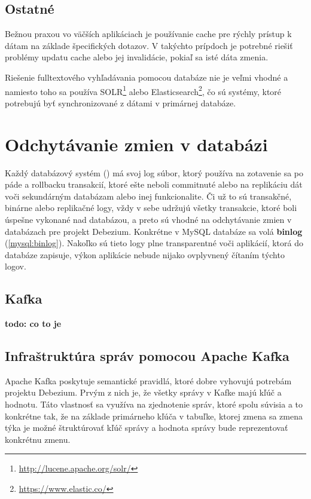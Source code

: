 \subsection{Ostatné}
Bežnou praxou vo väčších aplikáciach je používanie cache pre rýchly prístup k dátam na základe špecifických dotazov. V takýchto prípdoch je potrebné riešiť problémy updatu cache alebo jej invalidácie, pokiaľ sa isté dáta zmenia.

Riešenie fulltextového vyhľadávania pomocou databáze nie je veľmi vhodné a namiesto toho sa používa SOLR\footnote{\url{http://lucene.apache.org/solr/}} alebo Elasticsearch\footnote{\url{https://www.elastic.co/}}, čo sú systémy, ktoré potrebujú byť synchronizované z dátami v primárnej databáze. 


\section{Odchytávanie zmien v databázi}
Každý databázový systém () má svoj log súbor, ktorý používa na zotavenie sa po páde a rollbacku transakcií, ktoré ešte neboli commitnuté alebo na replikáciu dát voči sekundárným databázam alebo inej funkcionalite. Či už to sú transakčné, binárne alebo replikačné logy, vždy v sebe udržujú všetky transakcie, ktoré boli úspešne vykonané nad databázou, a preto sú vhodné na odchytávanie zmien v databázach pre projekt Debezium. Konkrétne v MySQL databáze sa volá \textbf{binlog} (\ref{mysql:binlog}). Nakoľko sú tieto logy plne transparentné voči aplikácií, ktorá do databáze zapisuje, výkon aplikácie nebude nijako ovplyvnený čítaním týchto logov.

\subsection{Kafka}
\textbf{todo: co to je}

\subsection{Infraštruktúra správ pomocou Apache Kafka}
Apache Kafka\cite{Kafka} poskytuje semantické pravidlá, ktoré dobre vyhovujú potrebám projektu Debezium. Prvým z nich je, že všetky správy v Kafke majú kľúč a hodnotu. Táto vlastnosť sa využíva na zjednotenie správ, ktoré spolu súvisia a to konkrétne tak, že na základe primárneho kľúča v tabuľke, ktorej zmena sa zmena týka je možné štruktúrovať kľúč správy a hodnota správy bude reprezentovať konkrétnu zmenu. 


